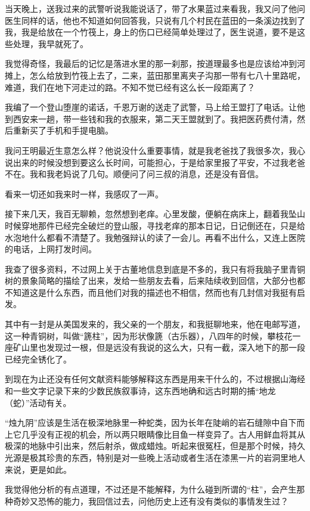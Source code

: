 当天晚上，送我过来的武警听说我能说话了，带了水果蓝过来看我，我又问了他问医生同样的话，他也不知道如何回答我，只说有几个村民在蓝田的一条溪边找到了我，我是给放在一个竹筏上，身上的伤口已经简单处理过了，医生说道，要不是这些处理，我早就死了。

我觉得奇怪，我最后的记忆是落进水里的那一刹那，按道理最多也是应该给冲到河摊上，怎么给放到竹筏上去了，二来，蓝田那里离夹子沟那一带有七八十里路呢，难道，我们在地下河走过的路。不知不觉已经有这么长一段距离了？

我编了一个登山堕崖的诺话，千恩万谢的送走了武警，马上给王盟打了电话。让他到西安来一趟，带一些钱和我的衣服来，第二天王盟就到了。我把医药费付清，然后重新买了手机和手提电脑。

我问王明最近生意怎么样？他说没什么重要事情，就是我老爸找了我很多次，我心说出来的时候没想到要这么长时间，可能担心，于是给家里报了平安，不过我老爸不在。我和我老妈说了几句。顺便问了问三叔的消息，还是没有音信。

看来一切还如我来时一样，我感叹了一声。

接下来几天，我百无聊赖，忽然想到老痒。心里发酸，便躺在病床上，翻着我坠山时候穿地那件已经完全破烂的登山服，寻找老痒的那本日记，日记倒还在，只是给水泡地什么都看不清楚了。我勉强辩认的读了一会儿。再看不出什么，又连上医院的电话，上网打发时间。

我查了很多资料，不过网上关于古董地信息到底是不多的，我只有将我脑子里青铜树的景象简略的描绘了出来，发给一些朋友去看，后来陆续收到回信，大部分也都不知道这是什么东西，而且他们对我的描述也不相信，然而也有几封信对我挺有启发。

其中有一封是从美国发来的，我父亲的一个朋友，和我挺聊地来，他在电邮写道，这一种青铜树，叫做“篪柱”，因为形状像篪（古乐器），八四年的时候，攀枝花一座矿山里也发现过一根，但是远没有我说的这么大，只有一截，深入地下的那一段已经完全锈化了。

到现在为止还没有任何文献资料能够解释这东西是用来干什么的，不过根据山海经和一些文字记录下来的少数民族叙事诗，这东西地确和远古时期的捕“地龙（蛇）”活动有关。

“烛九阴”应该是生活在极深地脉里一种蛇类，因为长年在陡峭的岩石缝隙中自下而上它几乎没有正视的机会，所以两只眼睛像比目鱼一样变异了。古人用鲜血将其从极深的地脉中引出来，然后射杀，做成蜡烛。听起来很冤枉，但是那个时候，持久光源是极其珍贵的东西，特别是对一些晚上活动或者生活在漆黑一片的岩洞里地人来说，更是如此。

我觉得他分析的有点道理，不过还是不能解释，为什么碰到所谓的“柱”，会产生那种奇妙又恐怖的能力，我回信过去，问他历史上还有没有类似的事情发生过？


